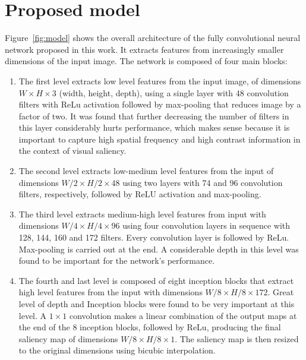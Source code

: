 \documentclass[10pt,twocolumn,letterpaper]{article}
\begin{document}
\section{Proposed model}
Figure~\ref{fig:model} shows the overall architecture of the fully
convolutional neural network proposed in this work.
It extracts features from increasingly smaller dimensions of the
input image.
The network is composed of four main blocks:

\begin{enumerate}
    \item The first level extracts low level features from the input image, of
        dimensions $W\times H \times 3$ (width, height, depth), using
        a single layer with 48 convolution filters with ReLu activation
        followed by max-pooling that reduces image by a factor of two.
        It was found that further decreasing the number of filters in this
        layer considerably hurts performance, which makes sense because it is
        important to capture high spatial frequency and high contrast
        information in the context of visual saliency.
    \item The second level extracts low-medium level features from the
        input of dimensions $W/2 \times H/2 \times 48$ using two layers
        with 74 and 96 convolution filters, respectively, followed by ReLU
        activation and max-pooling.
    \item The third level extracts medium-high level features from input with
        dimensions $W/4 \times H/4 \times 96$ using four convolution layers
        in sequence with 128, 144, 160 and 172 filters.
        Every convolution layer is followed by ReLu.
        Max-pooling is carried out at the end.
        A considerable depth in this level was found to be important for
        the network's performance.
    \item The fourth and last level is composed of eight inception blocks
        that extract high level features from the input with
        dimensions $W/8 \times H/8 \times 172$.
        Great level of depth and Inception blocks were found to be very
        important at this level.
        A $1 \times 1$ convolution makes a linear combination of the output
        maps at the end of the 8 inception blocks, followed by ReLu, producing
        the final saliency map of dimensions $W/8 \times H/8 \times 1$.
        The saliency map is then resized to the original dimensions using
        bicubic interpolation.
\end{enumerate}
\end{document}

